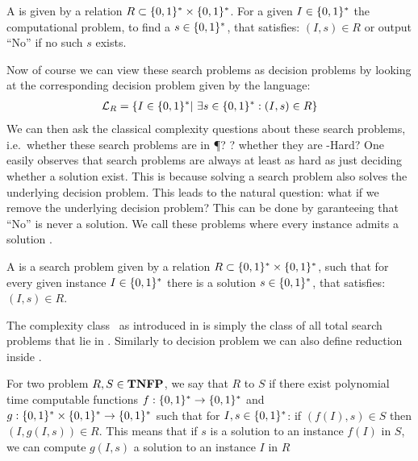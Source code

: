 \begin{definition}
    A  is given by a relation $R\subset \{0, 1\}^* \times \{0, 1\}^*$.
    For a given  $I\in \{0, 1\}^*$ the computational problem, to find a  $s \in \{0, 1\}^*$, that satisfies:
    $(I, s) \in R$ or output ``No'' if no such $s$ exists.
\end{definition}
Now of course we can view these search problems as decision problems by looking at the corresponding decision problem given by the language:
\begin{align*}
    \mathcal{L}_R = \{ I \in \{0, 1\}^* |\ \exists s \in \{0, 1\}^* : (I, s) \in R\}
\end{align*}
We can then ask the classical complexity questions about these search problems, i.e.~whether these search problems are in \P? \NP? whether they are \NP-Hard?
One easily observes that search problems are always at least as hard as just deciding whether a solution exist.
This is because solving a search problem also solves the underlying decision problem.
This leads to the natural question: what if we remove the underlying decision problem?
This can be done by garanteeing that ``No'' is never a solution.
We call these problems where every instance admits a solution .
\begin{definition}
    A  is a search problem given by a relation $R\subset \{0, 1\}^* \times \{0, 1\}^*$, such that for every given instance $I\in
        \{0, 1\}^*$ there is a solution $s \in \{0, 1\}^*$, that satisfies: $(I, s) \in R$.
\end{definition}
The complexity class \TFNP\ as introduced in  is simply the class of all total search problems that lie in \NP.
Similarly to decision problem we can also define reduction inside \TFNP.
\begin{definition}[Reduction]
    For two problem $R, S \in \textbf{TNFP}$, we say that $R$  to $S$ if there exist polynomial time computable functions $f : \{0, 1\}^* \rightarrow
        \{0, 1\}^*$ and $g : \{0, 1\}^* \times \{0, 1\}^* \rightarrow \{0, 1\}^*$ such that for $I, s \in \{0, 1\}^*$: if $(f(I), s) \in S$ then $(I, g(I, s)) \in R$.
    This means that if $s$ is a solution to an instance $f(I)$ in $S$, we can compute $g(I, s)$ a solution to an instance $I$ in $R$
\end{definition}

